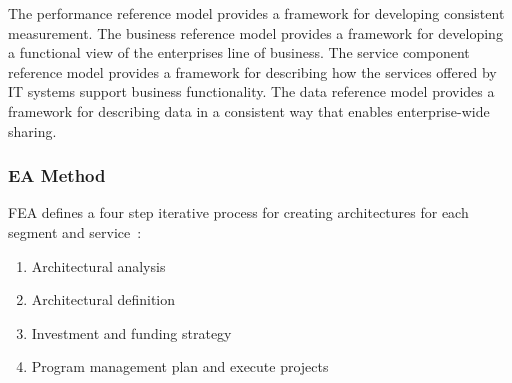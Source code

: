The performance reference model provides a framework for developing consistent measurement. The business reference model provides a framework for developing a functional view of the enterprises line of business. The service component reference model provides a framework for describing how the services offered by IT systems support business functionality.  The data reference model provides a framework for describing data in a consistent way that enables enterprise-wide sharing. 

\subsubsection{EA Method}


%
%

 
FEA defines a four step iterative process for creating architectures for each segment and service~\cite{FEA_PMO2007}:
\begin{enumerate}
    \item Architectural analysis
    \item Architectural definition
    \item Investment and funding strategy
    \item Program management plan and execute projects
\end{enumerate}


